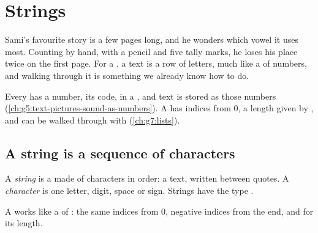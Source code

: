 \chapter{Strings}\label{ch:g7:strings}

Sami's favourite story is a few pages long, and he wonders which vowel it uses
most. Counting by hand, with a pencil and five tally marks, he loses his place
twice on the first page. For a , a text is a row of letters, much like
a  of numbers, and walking through it is something we already know how to
do.

\begin{recall}
Every  has a number, its code, in a , and text is stored as
those numbers (\cref{ch:g5:text-pictures-sound-as-numbers}). A  has
indices from 0, a length given by , and can be walked through with
 (\cref{ch:g7:lists}).
\end{recall}

\section{A string is a sequence of characters}

\begin{definition}\label{def:g7:strings:string}
A \emph{string} is a  made of characters in order: a text,
written between quotes. A \emph{character} is one letter,
digit, space or sign. Strings have the type .
\end{definition}

A  works like a  of : the same indices from 0, negative
indices from the end, and  for its length.

\label{lst:g7:strings:basics}

\label{out:g7:strings:basics}

